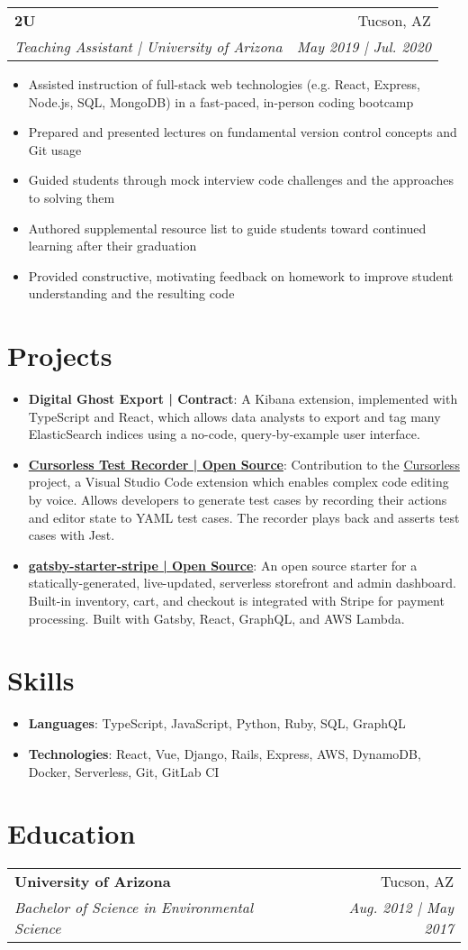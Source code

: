 \documentclass[letterpaper,11pt]{article}
\makeatletter
\newcommand{\resumeSubheading}[4]{
  \vspace{6pt}
  \begin{tabular*}{0.97\textwidth}[t]{l@{\extracolsep{\fill}}r}
    \textbf{#1} & #2 \\
    \textit{\small#3} & \textit{\small #4} \\
  \end{tabular*}\vspace{-5pt}
}
\newenvironment{resumeList}{\begin{itemize}[leftmargin=*]}{\end{itemize}\vspace{-5pt}}
\newcommand{\resumeItem}[1]{
  \item\small{
      #1 \vspace{-4pt}
  }
}
\newcommand{\resumeTitledItem}[2]{
  \item\small{
    \textbf{#1}{: #2 \vspace{-2pt}}
  }
}
\makeatother
\begin{document}
  \resumeSubheading
    {2U}{Tucson, AZ}
    {Teaching Assistant | University of Arizona}{May 2019 | Jul. 2020}
    \begin{resumeList}
      \resumeItem
        {Assisted instruction of full-stack web technologies (e.g. React, Express, Node.js, SQL, MongoDB) in a fast-paced, in-person coding bootcamp}
      \resumeItem
        {Prepared and presented lectures on fundamental version control concepts and Git usage}
      \resumeItem
        {Guided students through mock interview code challenges and the approaches to solving them}
      \resumeItem
        {Authored supplemental resource list to guide students toward continued learning after their graduation}
      \resumeItem
        {Provided constructive, motivating feedback on homework to improve student understanding and the resulting code}
    \end{resumeList}


\section{Projects}
  \begin{resumeList}
    \resumeTitledItem{Digital Ghost Export | Contract}
    {A Kibana extension, implemented with TypeScript and React, which allows data analysts to export and tag many ElasticSearch indices using a no-code, query-by-example user interface.}
    \resumeTitledItem{\href{https://github.com/cursorless-dev/cursorless-vscode}{Cursorless Test Recorder | Open Source}}
      {Contribution to the {\href{https://github.com/cursorless-dev/cursorless-vscode}{Cursorless}} project, a Visual Studio Code extension which enables complex code editing by voice. Allows developers to generate test cases by recording their actions and editor state to YAML test cases. The recorder plays back and asserts test cases with Jest.}
    \resumeTitledItem{\href{https://github.com/brxck/gatsby-starter-stripe}{gatsby-starter-stripe | Open Source}}
      {An open source starter for a statically-generated, live-updated, serverless storefront and admin dashboard. Built-in inventory, cart, and checkout is integrated with Stripe for payment processing. Built with Gatsby, React, GraphQL, and AWS Lambda.}
  \end{resumeList}

\section{Skills}
  \begin{resumeList}
    \resumeTitledItem{Languages}{TypeScript, JavaScript, Python, Ruby, SQL, GraphQL}
    \resumeTitledItem{Technologies}{React, Vue, Django, Rails, Express, AWS, DynamoDB, Docker, Serverless, Git, GitLab CI}
  \end{resumeList}

\section{Education}
  \resumeSubheading
  {University of Arizona}{Tucson, AZ}
  {Bachelor of Science in Environmental Science}{Aug. 2012 | May 2017}
\end{document}
